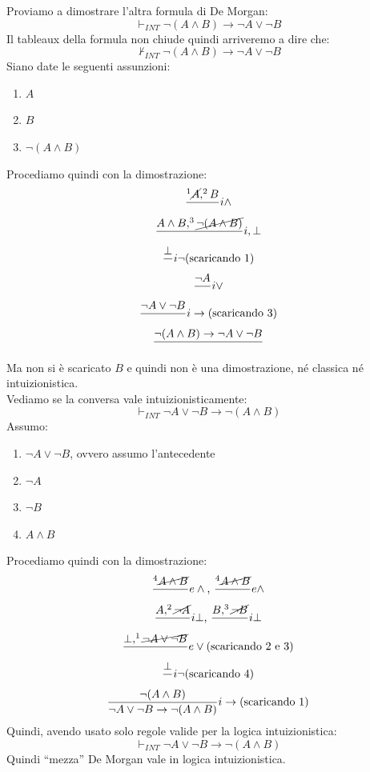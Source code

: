 \documentclass[a4paper,12pt, oneside]{book}
\begin{document}
\begin{esempio}
  Proviamo a dimostrare l'altra formula di De Morgan:
  \[\vdash_{INT}\neg(A\land B)\to \neg A\lor \neg B\]
  Il tableaux della formula non chiude quindi arriveremo a dire che:
  \[\nvdash_{INT}\neg(A\land B)\to \neg A\lor \neg B\]
  Siano date le seguenti assunzioni:
  \begin{enumerate}
    \item $A$
    \item $B$
    \item $\neg(A\land B)$
  \end{enumerate}
  Procediamo quindi con la dimostrazione:
  \begin{gather*}
    \frac{^1\cancel{A},^2B}{}i\land\\
    \frac{A\land B, ^3\cancel{\neg(A\land B)}}{}i,\bot\\
    \frac{\bot}{}i\neg\mbox{(scaricando 1)}\\
    \frac{\neg A}{}i\lor\\
    \frac{\neg A \lor \neg B}{}i\to\mbox{(scaricando 3)}\\ 
    \frac{\neg(A\land B)\to\neg A\lor \neg B}{}
  \end{gather*}
  Ma non si è scaricato $B$ e quindi non è una dimostrazione, né classica né
  intuizionistica.\\
  Vediamo se la conversa vale intuizionisticamente:
  \[\vdash_{INT}\neg A\lor \neg B\to\neg(A\land B)\]
  Assumo:
  \begin{enumerate}
    \item $\neg A\lor \neg B$, ovvero assumo l'antecedente
    \item $\neg A$
    \item $\neg B$
    \item $A\land B$
  \end{enumerate}
 Procediamo quindi con la dimostrazione:
 \begin{gather*}
    \frac{ ^4\cancel{A\land B}}{}e\land\mbox{, }
    \frac{ ^4\cancel{A\land B}}{}e\land\\
    \frac{A, ^2\cancel{\neg A}}{}i\bot\mbox{, }
    \frac{B,^3\cancel{\neg B}}{}i\bot\\
    \frac{\bot, ^1\cancel{\neg A\lor \neg B}}{}e\lor\mbox{(scaricando 2 e 3)}\\
    \frac{\bot}{}i\neg\mbox{(scaricando 4)}\\
    \frac{\neg (A\land B)}{\neg A\lor \neg B\to\neg(A\land
      B)}i\to\mbox{(scaricando 1)} 
  \end{gather*}
  Quindi, avendo usato solo regole valide per la logica intuizionistica:
  \[\vdash_{INT}\neg A\lor \neg B\to\neg(A\land B)\]
  Quindi ``mezza'' De Morgan vale in logica intuizionistica.
\end{esempio}
\end{document}
